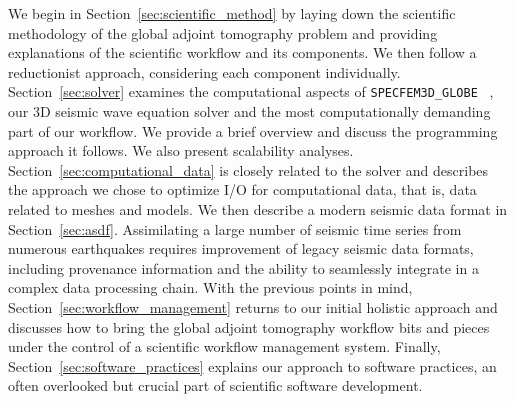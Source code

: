We begin in Section~\ref{sec:scientific_method} by laying down the scientific
methodology of the global adjoint tomography problem and providing explanations
of the scientific workflow and its components. We then follow a reductionist
approach, considering each component individually. Section~\ref{sec:solver}
examines the computational aspects of \texttt{SPECFEM3D\_GLOBE}
~\cite{KoTr02a, KoTr02b}, our 3D seismic wave
equation solver and the most computationally demanding part of our workflow. We
provide a brief overview and discuss the programming approach it follows. We also
present scalability analyses. Section~\ref{sec:computational_data} is 
closely related to the solver and describes the approach we chose to optimize
I/O for computational data, that is, data related to meshes and models. We then
describe a modern seismic data format in Section~\ref{sec:asdf}.
Assimilating a large number of seismic time series from numerous earthquakes requires
improvement of legacy seismic data formats, including provenance  information
and the ability to seamlessly integrate in a complex data processing chain.
With the previous points in mind, Section~\ref{sec:workflow_management}
returns to our initial holistic approach and discusses how to bring the global
adjoint tomography workflow bits and pieces under the control of a scientific
workflow management system. Finally, Section~\ref{sec:software_practices}
explains our approach to software practices, an often overlooked but crucial
part of scientific software development.

